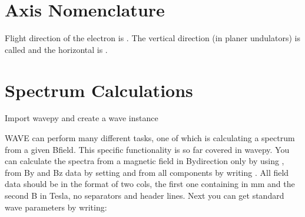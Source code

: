 \documentclass[letterpaper,10pt,english]{sphinxmanual}
\begin{document}
\section{Axis Nomenclature}
\label{\detokenize{tutorial:axis-nomenclature}}
\sphinxAtStartPar
Flight direction of the electron is  .
The vertical direction (in planer undulators) is called
 and the horizontal is 
.


\section{Spectrum Calculations}
\label{\detokenize{tutorial:spectrum-calculations}}
\sphinxAtStartPar
Import wavepy and create a wave instance

\begin{sphinxVerbatim}[commandchars=\\\{\}]
   
  
\end{sphinxVerbatim}

\sphinxAtStartPar
WAVE can perform many different tasks, one of which is calculating a
spectrum from a given B\sphinxhyphen{}field. This specific functionality is so far
covered in wavepy. You can calculate the spectra from a magnetic field
in Bydirection only by using , from By and Bz data
by setting  and from all components by writing
. All field data should be in the format of two cols,
the first one containing  in mm and the second B in Tesla,
no separators and header lines.
Next you can get standard wave parameters by writing:
\end{document}
